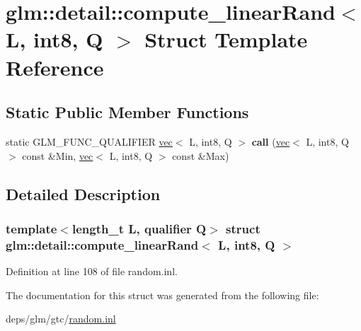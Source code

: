 \hypertarget{structglm_1_1detail_1_1compute__linearRand_3_01L_00_01int8_00_01Q_01_4}{}\section{glm\+:\+:detail\+:\+:compute\+\_\+linear\+Rand$<$ L, int8, Q $>$ Struct Template Reference}
\label{structglm_1_1detail_1_1compute__linearRand_3_01L_00_01int8_00_01Q_01_4}
\subsection*{Static Public Member Functions}
\begin{DoxyCompactItemize}
\item 
\mbox{\label{structglm_1_1detail_1_1compute__linearRand_3_01L_00_01int8_00_01Q_01_4_a77196d894abedcf8494dd983781432bf}} 
static G\+L\+M\+\_\+\+F\+U\+N\+C\+\_\+\+Q\+U\+A\+L\+I\+F\+I\+ER \hyperlink{structglm_1_1vec}{vec}$<$ L, int8, Q $>$ {\bfseries call} (\hyperlink{structglm_1_1vec}{vec}$<$ L, int8, Q $>$ const \&Min, \hyperlink{structglm_1_1vec}{vec}$<$ L, int8, Q $>$ const \&Max)
\end{DoxyCompactItemize}


\subsection{Detailed Description}
\subsubsection*{template$<$length\+\_\+t L, qualifier Q$>$\newline
struct glm\+::detail\+::compute\+\_\+linear\+Rand$<$ L, int8, Q $>$}



Definition at line 108 of file random.\+inl.



The documentation for this struct was generated from the following file\+:\begin{DoxyCompactItemize}
\item 
deps/glm/gtc/\hyperlink{random_8inl}{random.\+inl}\end{DoxyCompactItemize}
